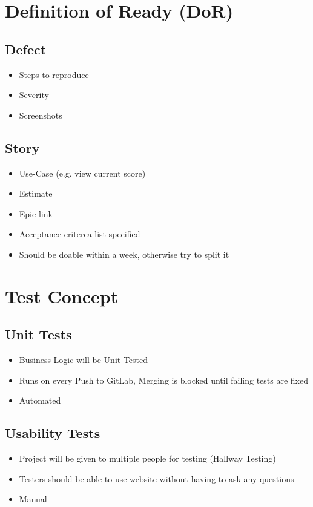 \section{Definition of Ready (DoR)}

\subsection{Defect} 
\begin{itemize}
    \item Steps to reproduce 
    \item Severity 
    \item Screenshots 
\end{itemize}

\subsection{Story}
\begin{itemize}
    \item Use-Case (e.g. view current score)
    \item Estimate 
    \item Epic link 
    \item Acceptance criterea list specified 
    \item Should be doable within a week, otherwise try to split it 
\end{itemize}

\section{Test Concept}
\subsection{Unit Tests}
\begin{itemize}
    \item Business Logic will be Unit Tested
    \item Runs on every Push to GitLab, Merging is blocked until failing tests are fixed
    \item Automated
\end{itemize}

\subsection{Usability Tests}
\begin{itemize}
    \item Project will be given to multiple people for testing (Hallway Testing)
    \item Testers should be able to use website without having to ask any questions
    \item Manual
\end{itemize}

